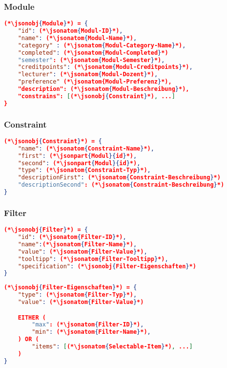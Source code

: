 \subsubsection{Module}
\begin{lstlisting}[language=json,firstnumber=1]
(*\jsonobj{Module}*) = {
	"id": (*\jsonatom{Modul-ID}*),
	"name": (*\jsonatom{Modul-Name}*),
	"category" : (*\jsonatom{Modul-Category-Name}*),
	"completed": (*\jsonatom{Modul-Completed}*)
	"semester": (*\jsonatom{Modul-Semester}*),
	"creditpoints": (*\jsonatom{Modul-Creditpoints}*),
	"lecturer": (*\jsonatom{Modul-Dozent}*),
	"preference" (*\jsonatom{Modul-Preferenz}*),
	"description": (*\jsonatom{Modul-Beschreibung}*),	
	"constrains": [(*\jsonobj{Constraint}*), ...]	
}
\end{lstlisting}

\subsubsection{Constraint}
\begin{lstlisting}[language=json,firstnumber=1]
(*\jsonobj{Constraint}*) = {
	"name": (*\jsonatom{Constraint-Name}*),
	"first": (*\jsonpart{Modul}{id}*),
	"second": (*\jsonpart{Modul}{id}*),
	"type": (*\jsonatom{Constraint-Typ}*),
	"descriptionFirst": (*\jsonatom{Constraint-Beschreibung}*)
	"descriptionSecond": (*\jsonatom{Constraint-Beschreibung}*)	
}
\end{lstlisting}

\subsubsection{Filter}
\begin{lstlisting}[language=json,firstnumber=1]
(*\jsonobj{Filter}*) = {
	"id": (*\jsonatom{Filter-ID}*),
	"name":(*\jsonatom{Filter-Name}*),
	"value": (*\jsonatom{Filter-Value}*),
	"tooltipp": (*\jsonatom{Filter-Tooltipp}*),
	"specification": (*\jsonobj{Filter-Eigenschaften}*)
}
\end{lstlisting}
\begin{lstlisting}[language=json,firstnumber=1]
(*\jsonobj{Filter-Eigenschaften}*) = {
	"type": (*\jsonatom{Filter-Typ}*),
	"value": (*\jsonatom{Filter-Value}*)

	EITHER (
		"max": (*\jsonatom{Filter-ID}*),
		"min": (*\jsonatom{Filter-Name}*),
	) OR (
		"items": [(*\jsonatom{Selectable-Item}*), ...]
	)
}
\end{lstlisting}

